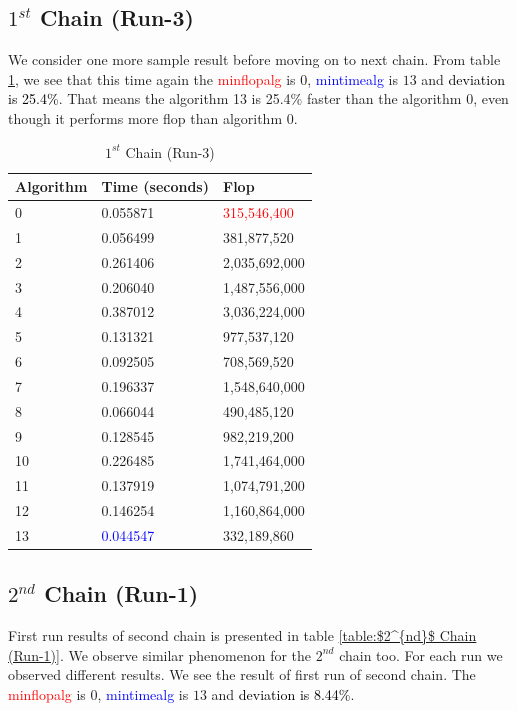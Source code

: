 \documentclass[10pts]{article}
\begin{document}
\subsection*{$1^{st}$ Chain (Run-3)  } 
 We consider one more sample result before moving on to next chain. From table \ref{table:$1^{st}$ Chain (Run-3)}, we see that this time again the \textcolor{red}{min\textunderscore flop\textunderscore alg} is $0$, \textcolor{blue}{min\textunderscore time\textunderscore alg} is $13$ and  \textcolor{black}{deviation is 25.4\%}. That means the algorithm 13 is 25.4\% faster than the algorithm $0$, even though it performs more flop than algorithm 0.
\begin{table}
 	\centering
 	\begin{center}
 			\begin{tabular}{| l | l | l |}
 				\hline
 				\textbf{Algorithm}  & \textbf{Time} (seconds) & \textbf{Flop}\\
 				\hline	
 				0 	&	0.055871 	&	\textcolor{red}{315,546,400} 	\\		
 				1 	&	0.056499 	&	381,877,520 	\\		
 				2 	&	0.261406 	&	2,035,692,000 	\\		
 				3 	&	0.206040 	&	1,487,556,000	\\		
 				4 	&	0.387012 	&	3,036,224,000	\\		
 				5 	&	0.131321 	&	977,537,120 	\\		
 				6 	&	0.092505 	&	708,569,520 	\\		
 				7 	&	0.196337 	&	1,548,640,000 	\\		
 				8 	&	0.066044 	&	490,485,120 	\\		
 				9 	&	0.128545 	&	982,219,200	\\		
 				10 	&	0.226485 	&	1,741,464,000 	\\		
 				11 	&	0.137919 	&	1,074,791,200	\\		
 				12 	&	0.146254 	&	1,160,864,000 	\\		
 				13 	&	\textcolor{blue}{0.044547} 	&	332,189,860 \\
 				\hline
 			\end{tabular}		
 	\end{center}
 	\caption{$1^{st}$ Chain (Run-3)}
 	\label{table:$1^{st}$ Chain (Run-3)}
 \end{table}

\subsection*{$2^{nd}$ Chain (Run-1) } 
First run results of second chain is presented in table \ref{table:$2^{nd}$ Chain (Run-1)}. We observe similar phenomenon for the $2^{nd}$ chain too. For each run we observed different results. We see the result of first run of second chain. The \textcolor{red}{min\textunderscore flop\textunderscore alg} is $0$, \textcolor{blue}{min\textunderscore time\textunderscore alg} is $13$ and  \textcolor{black}{deviation is 8.44\%}. 
 
\end{document}
